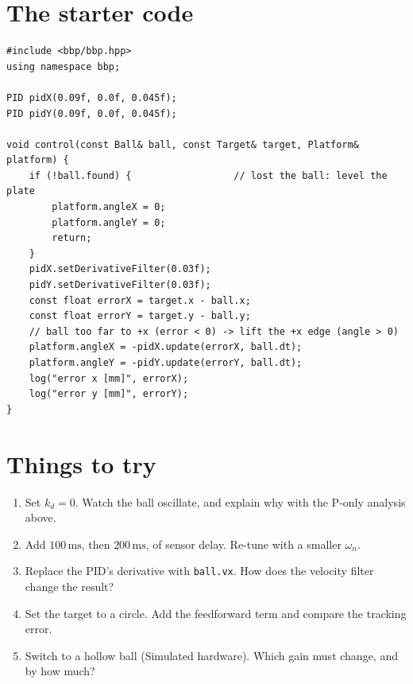 \documentclass[10pt,a4paper]{article}
\newcommand{\un}[1]{\,\mathrm{#1}}
\begin{document}
\section{The starter code}
\begin{lstlisting}
#include <bbp/bbp.hpp>
using namespace bbp;

PID pidX(0.09f, 0.0f, 0.045f);
PID pidY(0.09f, 0.0f, 0.045f);

void control(const Ball& ball, const Target& target, Platform& platform) {
    if (!ball.found) {                  // lost the ball: level the plate
        platform.angleX = 0;
        platform.angleY = 0;
        return;
    }
    pidX.setDerivativeFilter(0.03f);
    pidY.setDerivativeFilter(0.03f);
    const float errorX = target.x - ball.x;
    const float errorY = target.y - ball.y;
    // ball too far to +x (error < 0) -> lift the +x edge (angle > 0)
    platform.angleX = -pidX.update(errorX, ball.dt);
    platform.angleY = -pidY.update(errorY, ball.dt);
    log("error x [mm]", errorX);
    log("error y [mm]", errorY);
}
\end{lstlisting}

\section{Things to try}
\begin{enumerate}
  \item Set $k_d=0$. Watch the ball oscillate, and explain why with the P-only analysis above.
  \item Add $100\un{ms}$, then $200\un{ms}$, of sensor delay. Re-tune with a smaller $\omega_n$.
  \item Replace the PID's derivative with \texttt{ball.vx}. How does the velocity filter change
        the result?
  \item Set the target to a circle. Add the feedforward term and compare the tracking error.
  \item Switch to a hollow ball (Simulated hardware). Which gain must change, and by how much?
\end{enumerate}



\end{document}
